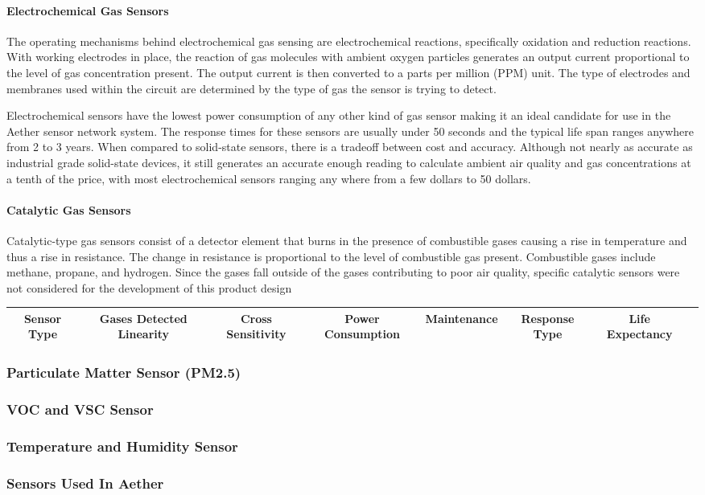\paragraph{Electrochemical Gas Sensors}
The operating mechanisms behind electrochemical gas sensing are electrochemical reactions, specifically oxidation and reduction reactions. With working electrodes in place, the reaction of gas molecules with ambient oxygen particles generates an output current proportional to the level of gas concentration present. The output current is then converted to a parts per million (PPM) unit. The type of electrodes and membranes used within the circuit are determined by the type of gas the sensor is trying to detect. 

Electrochemical sensors have the lowest power consumption of any other kind of gas sensor making it an ideal candidate for use in the Aether sensor network system. The response times for these sensors are usually under 50 seconds and the typical life span ranges anywhere from 2 to 3 years. When compared to solid-state sensors, there is a tradeoff between cost and accuracy. Although not nearly as accurate as industrial grade solid-state devices, it still generates an accurate enough reading to calculate ambient air quality and gas concentrations at a tenth of the price, with most electrochemical sensors ranging any where from a few dollars to 50 dollars. 
	
\paragraph{Catalytic Gas Sensors}
Catalytic-type gas sensors consist of a detector element that burns in the presence of combustible gases causing a rise in temperature and thus a rise in resistance. The change in resistance is proportional to the level of  combustible gas present. Combustible gases include methane, propane, and hydrogen. Since the gases fall outside of the gases contributing to poor air quality, specific catalytic sensors were not considered for the development of this product design

\begin{table}[H]
\centering
\footnotesize	
\begin{tabularx}{\linewidth}{c c c c c c c c}
\hline
 Sensor Type & Gases Detected Linearity & Cross Sensitivity & Power Consumption & Maintenance & Response Type & Life Expectancy \\\hline\hline
\end{tabularx}
\end{table}
\subsubsection{Particulate Matter Sensor (PM2.5)}

\subsubsection{VOC and VSC Sensor}

\subsubsection{Temperature and Humidity Sensor}

\subsubsection{Sensors Used In Aether}
